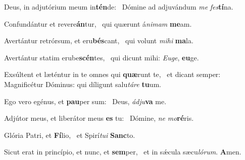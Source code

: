 \item Deus, in adjutórium meum in\textbf{tén}de:~\psstar{} Dómine ad adjuvándum \textit{me} \textit{fes}\textbf{tí}na.

\item Confundántur et revere\textbf{án}tur,~\psstar{} qui quærunt á\textit{nimam} \textbf{me}am.

\item Avertántur retrórsum, et eru\textbf{bés}cant,~\psstar{} qui volunt \textit{mihi} \textbf{ma}la.

\item Avertántur statim erube\textbf{scén}tes,~\psstar{} qui dicunt mihi: \textit{Euge}, \textbf{eu}ge.

\item Exsúltent et læténtur in te omnes qui \textbf{quæ}runt te,~\psstar{} et dicant semper: Magnificétur Dóminus: qui díligunt salu\textit{táre} \textbf{tu}um.

\item Ego vero egénus, et \textbf{pau}per sum:~\psstar{} Deus, \textit{ádju}\textbf{va} me.

\item Adjútor meus, et liberátor meus \textbf{es} tu:~\psstar{} Dómine, \textit{ne} \textit{mo}\textbf{ré}ris.

\item Glória Patri, et \textbf{Fí}lio,~\psstar{} et Spirí\textit{tui} \textbf{Sanc}to.

\item Sicut erat in princípio, et nunc, et \textbf{sem}per,~\psstar{} et in sǽcula sæcu\textit{lórum}. \textbf{A}men.

